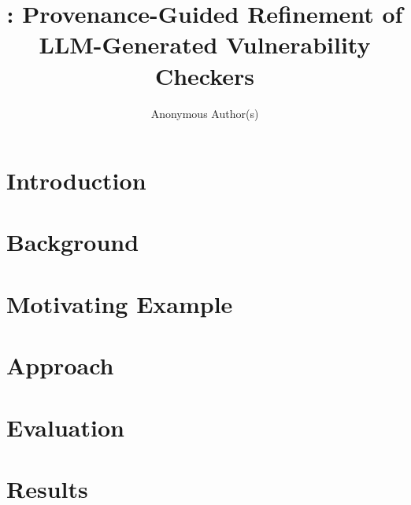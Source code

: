 \documentclass[acmsmall,screen,review,anonymous]{acmart}
\begin{document}
\title[\toolname]{\toolname: Provenance-Guided Refinement of LLM-Generated Vulnerability Checkers}

\author{Anonymous Author(s)}

\begin{abstract}

\end{abstract}
\maketitle


\section{Introduction}\label{sec:intro}


\section{Background}\label{sec:background}


\section{Motivating Example}\label{sec:motivating}


\section{Approach}\label{sec:approach}


\section{Evaluation}\label{sec:evaluation}




\section{Results}\label{sec:results}

\end{document}
